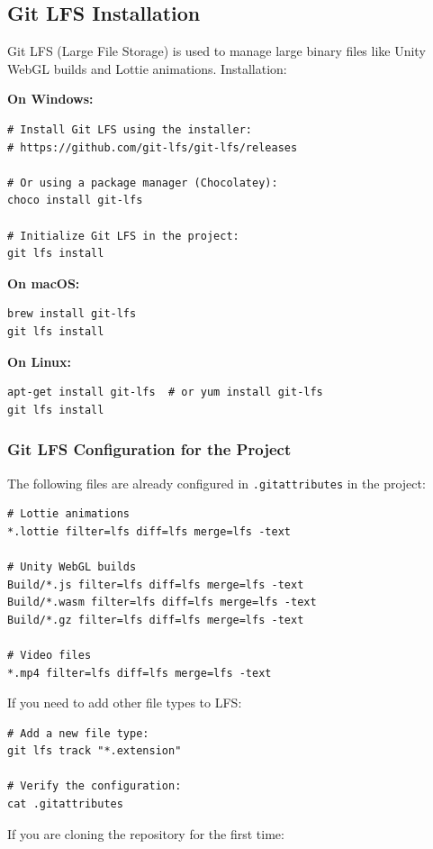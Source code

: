 \subsection{Git LFS Installation}

Git LFS (Large File Storage) is used to manage large binary files like Unity WebGL builds and Lottie animations. Installation:

\textbf{On Windows:}
\begin{verbatim}
# Install Git LFS using the installer:
# https://github.com/git-lfs/git-lfs/releases

# Or using a package manager (Chocolatey):
choco install git-lfs

# Initialize Git LFS in the project:
git lfs install
\end{verbatim}

\textbf{On macOS:}
\begin{verbatim}
brew install git-lfs
git lfs install
\end{verbatim}

\textbf{On Linux:}
\begin{verbatim}
apt-get install git-lfs  # or yum install git-lfs
git lfs install
\end{verbatim}

\subsubsection{Git LFS Configuration for the Project}

The following files are already configured in \texttt{.gitattributes} in the project:

\begin{verbatim}
# Lottie animations
*.lottie filter=lfs diff=lfs merge=lfs -text

# Unity WebGL builds
Build/*.js filter=lfs diff=lfs merge=lfs -text
Build/*.wasm filter=lfs diff=lfs merge=lfs -text
Build/*.gz filter=lfs diff=lfs merge=lfs -text

# Video files
*.mp4 filter=lfs diff=lfs merge=lfs -text
\end{verbatim}

If you need to add other file types to LFS:

\begin{verbatim}
# Add a new file type:
git lfs track "*.extension"

# Verify the configuration:
cat .gitattributes
\end{verbatim}

If you are cloning the repository for the first time:

